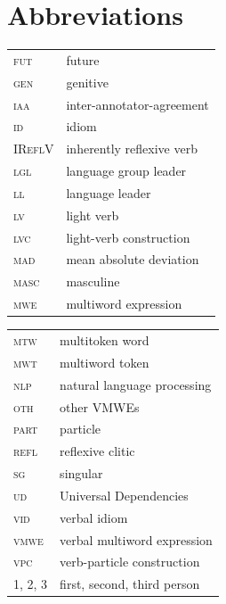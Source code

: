 \documentclass[output=paper,
modfonts,
]{langscibook}
\begin{document}
\section*{Abbreviations}
\label{sec:abbreviations}
%
\begin{tabularx}{.45\textwidth}{lp{4cm}}
\textsc{fut} & future \\
\textsc{gen} & genitive \\
\textsc{iaa} & inter-annotator-agreement \\
\textsc{id} & idiom \\
\textsc{IReflV} & inherently reflexive verb \\
\textsc{lgl} & language group leader \\
\textsc{ll} & language leader \\
\textsc{lv} & light verb \\
\textsc{lvc} & light-verb construction \\
\textsc{mad} & mean absolute deviation \\
\textsc{masc} & masculine \\
\textsc{mwe} & multiword expression \\
\end{tabularx}
\begin{tabularx}{.45\textwidth}{lp{4.5cm}}
\textsc{mtw} & multitoken word \\
\textsc{mwt} & multiword token \\
\textsc{nlp} & natural language processing \\
\textsc{oth} & other VMWEs \\
\textsc{part} & particle \\
\textsc{refl} & reflexive clitic \\
\textsc{sg} & singular \\
\textsc{ud} & Universal Dependencies \\
\textsc{vid} & verbal idiom \\
\textsc{vmwe} & verbal multiword expression \\
\textsc{vpc} & verb-particle construction \\
\textsc{1, 2, 3} & first, second, third person \\
\end{tabularx}




{\sloppy
\printbibliography[heading=subbibliography,notkeyword=this]
}

%
\end{document}
